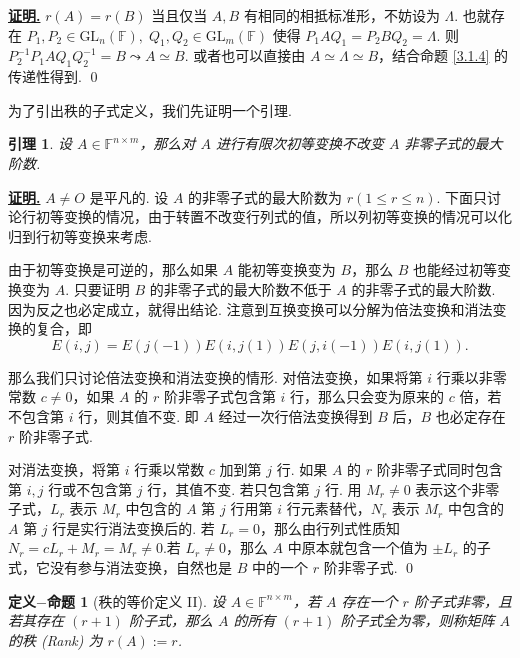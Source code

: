 \documentclass[10pt,openany]{article}
\theoremstyle{thmstyle} %
\theoremstyle{defstyle} %
\newtheorem{defprop}[theorem]{定义\(-\)命题}
\newtheorem{lemma}[theorem]{引理}
\theoremstyle{prostyle} %
\theoremstyle{exastyle}
\theoremstyle{remstyle}
\renewenvironment{proof}[1][证明]{\par\underline{\textbf{#1.}} \;\fangsong}{\qed\par}
\newcommand{\F}{\mathbb{F}}
\newcommand{\gfn}{\text{GL}_n(\mathbb{F})}
\newcommand{\gfm}{\text{GL}_m(\mathbb{F})}
\newcommand{\nm}{^{n \times m}}
\begin{document}
\begin{proof}
	\( r(A)=r(B) \) 当且仅当 \( A,B \) 有相同的相抵标准形，不妨设为 \( \Lambda \). 也就存在 \( P_1,P_2 \in \gfn, \; Q_1,Q_2 \in \gfm \) 使得 \( P_1AQ_1=P_2BQ_2=\Lambda \). 则 \( P_2^{-1}P_1AQ_1Q_2^{-1}=B \leadsto A \simeq B \). 或者也可以直接由 \( A \simeq \Lambda \simeq B \)，结合命题 \ref{3.1.4} 的传递性得到.
\end{proof}


为了引出秩的子式定义，我们先证明一个引理.

\begin{lemma} \label{3.1.8}
	设 \( A \in \F\nm \)，那么对 \( A \) 进行有限次初等变换不改变 \( A \) 非零子式的最大阶数.
\end{lemma}

\begin{proof}
	 \( A \neq O \) 是平凡的. 设 \( A \) 的非零子式的最大阶数为 \( r (1 \leq r \leq n) \). 下面只讨论行初等变换的情况，由于转置不改变行列式的值，所以列初等变换的情况可以化归到行初等变换来考虑. 
	 
	 由于初等变换是可逆的，那么如果 \( A \) 能初等变换变为 \( B \)，那么 \( B \) 也能经过初等变换变为 \( A \). 只要证明 \( B \) 的非零子式的最大阶数不低于 \( A \) 的非零子式的最大阶数. 因为反之也必定成立，就得出结论. 注意到互换变换可以分解为倍法变换和消法变换的复合，即
	 \[ E(i,j)=E(j(-1))E(i,j(1))E(j,i(-1))E(i,j(1)). \]
	 
	 那么我们只讨论倍法变换和消法变换的情形. 对倍法变换，如果将第 \( i \) 行乘以非零常数 \( c \neq 0 \)，如果 \( A \) 的 \( r \) 阶非零子式包含第 \( i \) 行，那么只会变为原来的 \( c \) 倍，若不包含第 \( i \) 行，则其值不变. 即 \( A \) 经过一次行倍法变换得到 \( B \) 后，\( B \) 也必定存在 \( r \) 阶非零子式.
	 
	 对消法变换，将第 \( i \) 行乘以常数 \( c \) 加到第 \( j \) 行. 如果 \( A \) 的 \( r \) 阶非零子式同时包含第 \( i,j \) 行或不包含第 \( j \) 行，其值不变. 若只包含第 \( j \) 行. 用 \( M_r \neq 0  \) 表示这个非零子式，\( L_r \) 表示 \( M_r \) 中包含的 \( A \) 第 \( j \) 行用第 \( i \) 行元素替代，\( N_r \) 表示 \( M_r \) 中包含的 \( A \) 第 \( j \) 行是实行消法变换后的. 若 \( L_r=0 \)，那么由行列式性质知 \( N_r=cL_r+M_r=M_r \neq 0 \).若 \( L_r \neq 0 \)，那么 \( A \) 中原本就包含一个值为 \( \pm L_r \) 的子式，它没有参与消法变换，自然也是 \( B \) 中的一个 \( r \) 阶非零子式.
\end{proof}

\begin{defprop}[秩的等价定义 II] \label{3.1.9}
	设 \( A \in \F\nm \)，若 \( A \) 存在一个 \( r \) 阶子式非零，且若其存在 \( (r+1) \) 阶子式，那么 \( A \) 的所有  \( (r+1) \) 阶子式全为零，则称矩阵 \( A \) 的秩 (Rank) 为 \( r(A):=r \).
\end{defprop}
\end{document}
